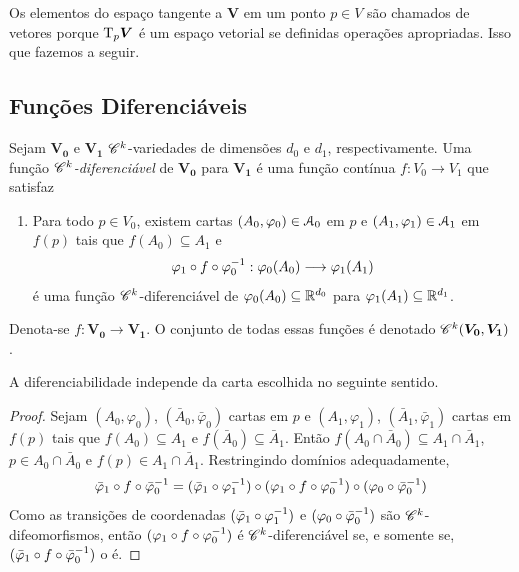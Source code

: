 Os elementos do espaço tangente a $\bm V$ em um ponto $p \in V$ são chamados de vetores porque $\mathrm{T}_p \bm V$ é um espaço vetorial se definidas operações apropriadas. Isso que fazemos a seguir.

\subsection{Funções Diferenciáveis}

\begin{defi}
Sejam $\bm{V_0}$ e $\bm{V_1}$ $\mathscr{C}^k$-variedades de dimensões $d_0$ e $d_1$, respectivamente. Uma função \emph{$\mathscr{C}^k$-diferenciável} de $\bm{V_0}$ para $\bm{V_1}$ é uma função contínua $f: V_0 \to V_1$ que satisfaz
	\begin{enumerate}
	\item Para todo $p \in V_0$, existem cartas $(A_0,\varphi_0) \in \mathcal{A}_0$ em $p$ e $(A_1,\varphi_1) \in \mathcal{A}_1$ em $f(p)$ tais que $f(A_0) \subseteq A_1$ e
		\begin{equation*}
		\varphi_1 \circ f \circ \varphi_0^{-1}: \varphi_0(A_0) \longrightarrow \varphi_1(A_1)
		\end{equation*}
é uma função $\mathscr{C}^k$-diferenciável de $\varphi_0(A_0) \subseteq \mathbb{R}^{d_0}$ para $\varphi_1(A_1) \subseteq \mathbb{R}^{d_1}$.
	\end{enumerate}
Denota-se $f: \bm{V_0} \to \bm{V_1}$. O conjunto de todas essas funções é denotado $\mathscr{C}^k(\bm{V_0},\bm{V_1})$.
\end{defi}

A diferenciabilidade independe da carta escolhida no seguinte sentido.
\begin{proof}
Sejam $(A_0,\varphi_0)$, $(\bar A_0,\bar\varphi_0)$ cartas em $p$ e $(A_1,\varphi_1)$, $(\bar A_1,\bar\varphi_1)$ cartas em $f(p)$ tais que $f(A_0) \subseteq A_1$ e $f(\bar A_0) \subseteq \bar A_1$. Então $f(A_0 \cap \bar A_0) \subseteq A_1 \cap \bar A_1$, $p \in A_0 \cap \bar A_0$ e $f(p) \in A_1 \cap \bar A_1$. Restringindo domínios adequadamente,
	\begin{equation*}
	\bar \varphi_1 \circ f \circ \bar \varphi_0^{-1} = (\bar \varphi_1 \circ \varphi_1^{-1}) \circ (\varphi_1 \circ f \circ \varphi_0 ^{-1}) \circ (\varphi_0 \circ \bar \varphi_0^{-1})
	\end{equation*}
Como as transições de coordenadas $(\bar \varphi_1 \circ \varphi_1^{-1})$ e $(\varphi_0 \circ \bar \varphi_0^{-1})$ são $\mathscr{C}^k$-difeomorfismos, então $(\varphi_1 \circ f \circ \varphi_0 ^{-1})$ é $\mathscr{C}^k$-diferenciável se, e somente se, $(\bar \varphi_1 \circ f \circ \bar \varphi_0^{-1})$ o é.
\end{proof}

